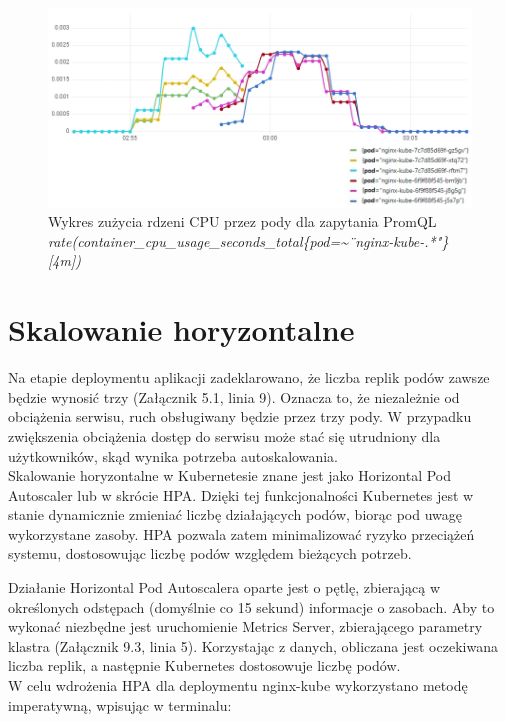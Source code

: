 \begin{figure}[H]
    \centering
    \includegraphics[width=1\textwidth]{img/cpu_rolling.jpg}
    \caption{Wykres zużycia rdzeni CPU przez pody dla zapytania PromQL \textit{rate(container\_cpu\_usage\_seconds\_total\{pod=\textasciitilde\"\ nginx-kube-.*"\}[4m])}}
\end{figure}

\section{Skalowanie horyzontalne}

Na etapie deploymentu aplikacji zadeklarowano, że liczba replik podów zawsze będzie wynosić trzy (Załącznik 5.1, linia 9). Oznacza to, że niezależnie od obciążenia serwisu, ruch obsługiwany będzie przez trzy pody. W przypadku zwiększenia obciążenia dostęp do serwisu może stać się utrudniony dla użytkowników, skąd wynika potrzeba autoskalowania.\\

Skalowanie horyzontalne w Kubernetesie znane jest jako Horizontal Pod Autoscaler lub w skrócie HPA. Dzięki tej funkcjonalności Kubernetes jest w stanie dynamicznie zmieniać liczbę działających podów, biorąc pod uwagę wykorzystane zasoby. HPA pozwala zatem minimalizować ryzyko przeciążeń systemu, dostosowując liczbę podów względem bieżących potrzeb.

Działanie Horizontal Pod Autoscalera oparte jest o pętlę, zbierającą w określonych odstępach (domyślnie co 15 sekund) informacje o zasobach. Aby to wykonać niezbędne jest uruchomienie Metrics Server, zbierającego parametry klastra (Załącznik 9.3, linia 5). Korzystając z danych, obliczana jest oczekiwana liczba replik, a następnie Kubernetes dostosowuje liczbę podów.\\

W celu wdrożenia HPA dla deploymentu nginx-kube wykorzystano metodę imperatywną, wpisując w terminalu:

